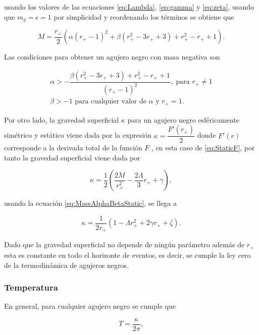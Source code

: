 usando los valores de las ecuaciones \eqref{eq:Lambda}, \eqref{eq:gamma} y \eqref{eq:zeta}, usando que $m_g=\epsilon=1$ por simplicidad y reordenando los términos se obtiene que

\begin{equation}
    M=\dfrac{r_+}{2}\left(\alpha(r_+-1)^2+\beta(r_+^2-3r_++3)+r_+^2-r_++1\right).
    \label{eq:MassAlphaBetaStatic}
\end{equation}

Las condiciones para obtener un agujero negro con masa negativa son

\begin{gather}
    \alpha>-\dfrac{\beta(r_+^2-3r_++3)+r_+^2-r_++1}{(r_+-1)^2}, \text{ para } r_+\neq 1\\
    \beta > -1 \text{ para cualquier valor de $\alpha$ y } r_+=1.
\end{gather}

Por otro lado, la gravedad superficial $\kappa$ para un agujero negro esféricamente simétrico y estático viene dada por la expresión $\kappa=\dfrac{F'(r_+)}{2}$ donde $F'(r)$ corresponde a la derivada total de la función $F$ \cite{ToolKit}, en esta caso de \eqref{eq:StaticF}, por tanto la gravedad superficial viene dada por

\begin{equation}
    \kappa=\dfrac{1}{2}\left(\dfrac{2M}{r_+^2}-\dfrac{2\Lambda}{3} r_+ + \gamma\right),
\end{equation}

usando la ecuación \eqref{eq:MassAlphaBetaStatic}, se llega a

\begin{equation}
    \kappa=\dfrac{1}{2r_+}\left(1-\Lambda r_+^2+2\gamma r_++\zeta\right).
    \label{eq:StaticSurfaceGravity}
\end{equation}

Dado que la gravedad superficial no depende de ningún parámetro además de $r_+$ esta es constante en todo el horizonte de eventos, es decir, se cumple la ley cero de la termodinámica de agujeros negros.

\subsubsection{Temperatura}

En general, para cualquier agujero negro se cumple que 

\begin{equation}
    T=\dfrac{\kappa}{2\pi},
\end{equation}

